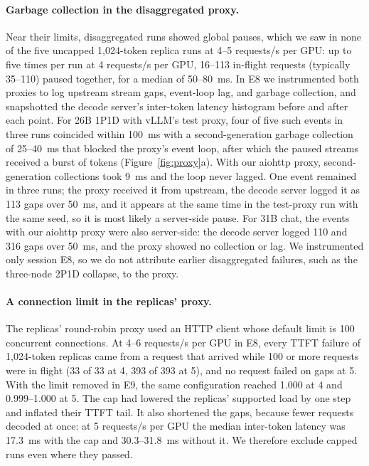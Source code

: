 \documentclass[11pt]{article}
\begin{document}
\paragraph{Garbage collection in the disaggregated proxy.} Near their limits, disaggregated runs showed global pauses, which we saw in none of the five uncapped 1,024-token replica runs at 4--5 requests/s per GPU: up to five times per run at 4 requests/s per GPU, 16--113 in-flight requests (typically 35--110) paused together, for a median of 50--80~ms. In E8 we instrumented both proxies to log upstream stream gaps, event-loop lag, and garbage collection, and snapshotted the decode server's inter-token latency histogram before and after each point. For 26B 1P1D with vLLM's test proxy, four of five such events in three runs coincided within 100~ms with a second-generation garbage collection of 25--40~ms that blocked the proxy's event loop, after which the paused streams received a burst of tokens (Figure~\ref{fig:proxy}a). With our aiohttp proxy, second-generation collections took 9~ms and the loop never lagged. One event remained in three runs; the proxy received it from upstream, the decode server logged it as 113 gaps over 50~ms, and it appears at the same time in the test-proxy run with the same seed, so it is most likely a server-side pause. For 31B chat, the events with our aiohttp proxy were also server-side: the decode server logged 110 and 316 gaps over 50~ms, and the proxy showed no collection or lag. We instrumented only session E8, so we do not attribute earlier disaggregated failures, such as the three-node 2P1D collapse, to the proxy.

\paragraph{A connection limit in the replicas' proxy.} The replicas' round-robin proxy used an HTTP client whose default limit is 100 concurrent connections. At 4--6 requests/s per GPU in E8, every TTFT failure of 1,024-token replicas came from a request that arrived while 100 or more requests were in flight (33 of 33 at 4, 393 of 393 at 5), and no request failed on gaps at 5. With the limit removed in E9, the same configuration reached 1.000 at 4 and 0.999--1.000 at 5. The cap had lowered the replicas' supported load by one step and inflated their TTFT tail. It also shortened the gaps, because fewer requests decoded at once: at 5 requests/s per GPU the median inter-token latency was 17.3~ms with the cap and 30.3--31.8~ms without it. We therefore exclude capped runs even where they passed.
\end{document}
